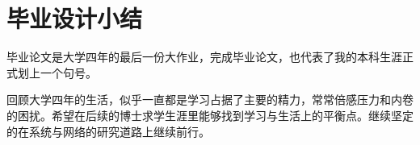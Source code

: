 \chapter*{毕业设计小结}

毕业论文是大学四年的最后一份大作业，完成毕业论文，也代表了我的本科生涯正式划上一个句号。

回顾大学四年的生活，似乎一直都是学习占据了主要的精力，常常倍感压力和内卷的困扰。希望在后续的博士求学生涯里能够找到学习与生活上的平衡点。继续坚定的在系统与网络的研究道路上继续前行。

\clearpage
\endinput